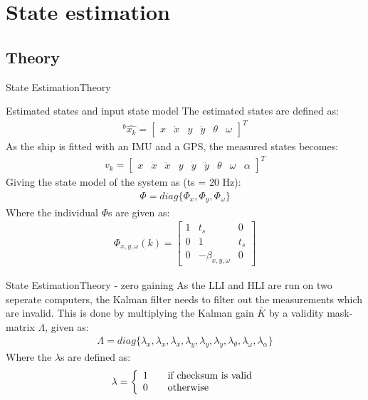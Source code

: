 \documentclass[10pt]{beamer}
\begin{document}

\section{State estimation}
\subsection{Theory}
\begin{frame}{State Estimation}{Theory}
\begin{block}{Estimated states and input state model}
The estimated states are defined as:
\begin{align}
^b\hat{x_k} = \begin{bmatrix}
x & \dot{x} & y & \dot{y} & \theta & \omega
\end{bmatrix}^T
\end{align}
As the ship is fitted with an IMU and a GPS, the measured states becomes:
\begin{align}
v_k = \begin{bmatrix}
x & \dot{x} & \ddot{x} & y & \dot{y} & \ddot{y} & \theta & \omega & \alpha
\end{bmatrix}^T
\end{align}
Giving the state model of the system as (ts = 20 Hz):
\begin{align}
\Phi = diag\{\Phi _x,\Phi _y,\Phi _\omega\}
\end{align}
Where the individual $\Phi$s are given as:
\begin{align}
\Phi_{x,y,\omega}(k) = \begin{bmatrix}
1 & t_s & 0\\
0 & 1 & t_s\\
0 & -\beta_{x,y,\omega} & 0
\end{bmatrix}
\label{eq:kal}
\end{align}
\end{block}
\end{frame}

\begin{frame}{State Estimation}{Theory - zero gaining}
As the LLI and HLI are run on two seperate computers, the Kalman filter needs to filter out the measurements which are invalid. This is done by multiplying the Kalman gain $\bar{K}$ by a validity mask-matrix $\Lambda$, given as:
\begin{align}
\Lambda = diag\{ \lambda_x,\lambda_{\dot{x}},\lambda_{\ddot{x}},\lambda_y,\lambda_{\dot{y}},\lambda_{\ddot{y}},\lambda_{\theta},\lambda_{\omega},\lambda_{\alpha} \}
\end{align}
Where the $\lambda$s are defined as:
\begin{align}
\lambda = 
\left\{
  \begin{array}{l l}
    1 & \quad \text{if checksum is valid}\\
    0 & \quad \text{otherwise}
  \end{array} \right.
\end{align}
\end{frame}
\end{document}
